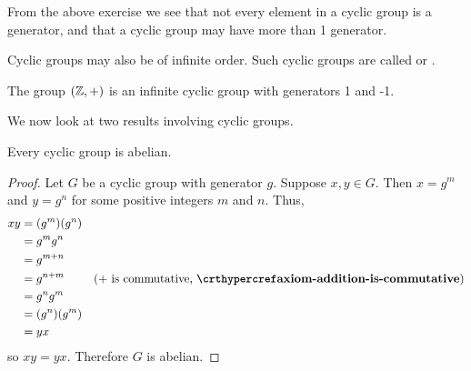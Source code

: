 From the above exercise we see that not every element in a cyclic group is a generator, and that a cyclic group may have more than 1 generator.

Cyclic groups may also be of infinite order. Such cyclic groups are called  or .
\begin{example}
    The group $(\mathbb{Z}, +)$ is an infinite cyclic group with generators 1 and -1.
\end{example}

We now look at two results involving cyclic groups.
\begin{proposition}\label{prop-cyclic-group-is-abelian}
    Every cyclic group is abelian.
\end{proposition}
\begin{proof}
    Let $G$ be a cyclic group with generator $g$. Suppose $x, y \in G$. Then $x = g^m$ and $y = g^n$ for some positive integers $m$ and $n$. Thus,
    \begin{align*}
        xy &= (g^m)(g^n)\\
        &= g^mg^n\\
        &= g^{m+n}\\
        &= g^{n+m} & (\text{+ is commutative, } \myref{axiom-addition-is-commutative})\\
        &= g^ng^m\\
        &= (g^n)(g^m)\\
        &= yx
    \end{align*}
    so $xy = yx$. Therefore $G$ is abelian.
\end{proof}

